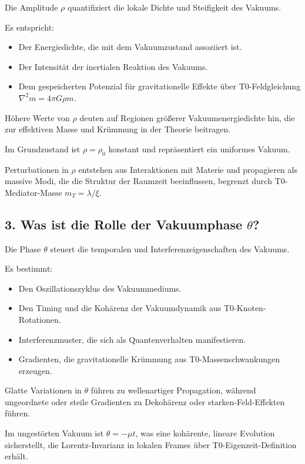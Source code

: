 	Die Amplitude $\rho$ quantifiziert die lokale Dichte und Steifigkeit des Vakuums.
	
	Es entspricht:
	\begin{itemize}
		\item Der Energiedichte, die mit dem Vakuumzustand assoziiert ist.
		\item Der Intensität der inertialen Reaktion des Vakuums.
		\item Dem gespeicherten Potenzial für gravitationelle Effekte über T0-Feldgleichung $\nabla^2 m = 4\pi G \rho m$.
	\end{itemize}
	
	Höhere Werte von $\rho$ deuten auf Regionen größerer Vakuumenergiedichte hin, die zur effektiven Masse und Krümmung in der Theorie beitragen.
	
	Im Grundzustand ist $\rho = \rho_0$ konstant und repräsentiert ein uniformes Vakuum.
	
	Perturbationen in $\rho$ entstehen aus Interaktionen mit Materie und propagieren als massive Modi, die die Struktur der Raumzeit beeinflussen, begrenzt durch T0-Mediator-Masse $m_T = \lambda / \xi$.
	
	\subsection{3. Was ist die Rolle der Vakuumphase $\theta$?}
	
	Die Phase $\theta$ steuert die temporalen und Interferenzeigenschaften des Vakuums.
	
	Es bestimmt:
	\begin{itemize}
		\item Den Oszillationszyklus des Vakuummediums.
		\item Den Timing und die Kohärenz der Vakuumdynamik aus T0-Knoten-Rotationen.
		\item Interferenzmuster, die sich als Quantenverhalten manifestieren.
		\item Gradienten, die gravitationelle Krümmung aus T0-Massenschwankungen erzeugen.
	\end{itemize}
	
	Glatte Variationen in $\theta$ führen zu wellenartiger Propagation, während ungeordnete oder steile Gradienten zu Dekohärenz oder starken-Feld-Effekten führen.
	
	Im ungestörten Vakuum ist $\theta = -\mu t$, was eine kohärente, lineare Evolution sicherstellt, die Lorentz-Invarianz in lokalen Frames über T0-Eigenzeit-Definition erhält.
	
